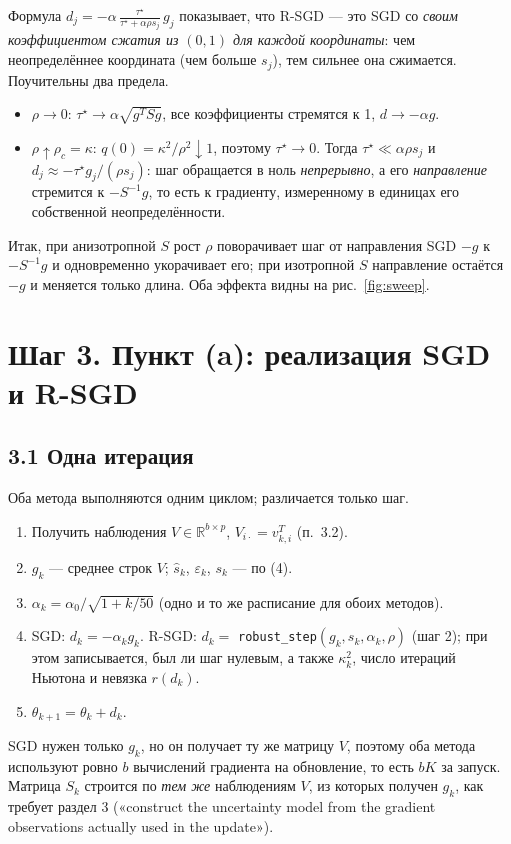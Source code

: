 \documentclass[11pt,a4paper]{article}
\begin{document}
Формула $d_j=-\alpha\,\frac{\tau^\star}{\tau^\star+\alpha\rho s_j}\,g_j$ показывает, что
R-SGD — это SGD со \emph{своим коэффициентом сжатия из $(0,1)$ для каждой
координаты}: чем неопределённее координата (чем больше $s_j$), тем сильнее она сжимается.
Поучительны два предела.
\begin{itemize}
\item $\rho\to0$: $\tau^\star\to\alpha\sqrt{g^TSg}$, все коэффициенты стремятся к 1,
$d\to-\alpha g$.
\item $\rho\uparrow\rho_c=\kappa$: $q(0)=\kappa^2/\rho^2\downarrow1$, поэтому
$\tau^\star\to0$. Тогда $\tau^\star\ll\alpha\rho s_j$ и
$d_j\approx-\tau^\star g_j/(\rho s_j)$: шаг обращается в ноль \emph{непрерывно}, а его
\emph{направление} стремится к $-S^{-1}g$, то есть к градиенту, измеренному в единицах
его собственной неопределённости.
\end{itemize}
Итак, при анизотропной $S$ рост $\rho$ поворачивает шаг от направления SGD $-g$ к
$-S^{-1}g$ и одновременно укорачивает его; при изотропной $S$ направление остаётся $-g$
и меняется только длина. Оба эффекта видны на рис.~\ref{fig:sweep}.

\section*{Шаг 3. Пункт (a): реализация SGD и R-SGD}

\subsection*{3.1 Одна итерация}

Оба метода выполняются одним циклом; различается только шаг.
\begin{enumerate}
\item Получить наблюдения $V\in\mathbb R^{b\times p}$, $V_{i\cdot}=v_{k,i}^T$ (п.~3.2).
\item $g_k$ — среднее строк $V$; $\widehat s_k$, $\varepsilon_k$, $s_k$ — по (4).
\item $\alpha_k=\alpha_0/\sqrt{1+k/50}$ (одно и то же расписание для обоих методов).
\item SGD: $d_k=-\alpha_kg_k$. R-SGD: $d_k=$ \texttt{robust\_step}$(g_k,s_k,\alpha_k,\rho)$
(шаг 2); при этом записывается, был ли шаг нулевым, а также $\kappa_k^2$, число итераций
Ньютона и невязка $r(d_k)$.
\item $\theta_{k+1}=\theta_k+d_k$.
\end{enumerate}
SGD нужен только $g_k$, но он получает ту же матрицу $V$, поэтому оба метода используют
ровно $b$ вычислений градиента на обновление, то есть $bK$ за запуск. Матрица $S_k$
строится по \emph{тем же} наблюдениям $V$, из которых получен $g_k$, как требует раздел 3
(«construct the uncertainty model from the gradient observations actually used in the
update»).
\end{document}
